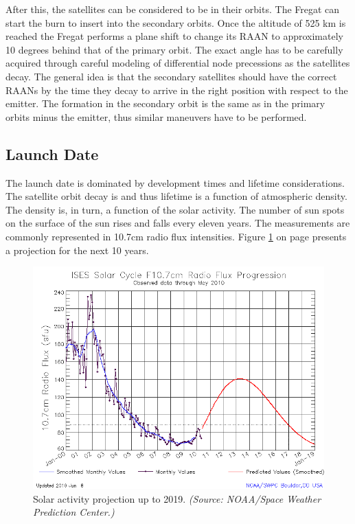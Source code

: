 After this, the satellites can be considered to be in their orbits. The Fregat can start the burn to insert into the secondary orbits. Once the altitude of 525 km is reached the Fregat performs a plane shift to change its \ac{RAAN} to approximately 10 degrees behind that of the primary orbit. The exact angle has to be carefully acquired through careful modeling of differential node precessions as the satellites decay. The general idea is that the secondary satellites should have the correct RAANs by the time they decay to arrive in the right position with respect to the emitter.  The formation in the secondary orbit is the same as in the primary orbits minus the emitter, thus similar maneuvers have to be performed.

\subsection{Launch Date}
\label{frLSLD}

The launch date is dominated by development times and lifetime considerations. The satellite orbit decay is and thus lifetime is a function of atmospheric density. The density is, in turn, a function of the solar activity. The number of sun spots on the surface of the sun rises and falls every eleven years. The measurements are commonly represented in 10.7cm radio flux intensities. Figure \ref{fig:f10.7} on page \pageref{fig:f10.7} presents a projection for the next 10 years.

\begin{figure}[h]
\centering
\includegraphics[width=1\textwidth, angle=0]{chapters/img/solarCycle.png}
\caption{Solar activity projection up to 2019. \emph{(Source: NOAA/Space Weather Prediction Center.)} }
\label{fig:f10.7}
\end{figure}

